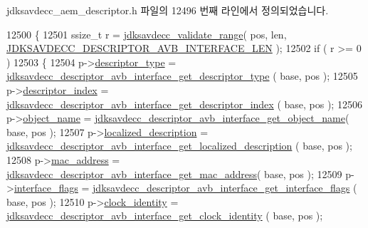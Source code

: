 jdksavdecc\+\_\+aem\+\_\+descriptor.\+h 파일의 12496 번째 라인에서 정의되었습니다.


\begin{DoxyCode}
12500 \{
12501     ssize\_t r = \hyperlink{group__util_ga9c02bdfe76c69163647c3196db7a73a1}{jdksavdecc\_validate\_range}( pos, len, 
      \hyperlink{group__descriptor__avb__interface_gaa0de60188c16df7f04fbc87d490112bc}{JDKSAVDECC\_DESCRIPTOR\_AVB\_INTERFACE\_LEN} );
12502     \textcolor{keywordflow}{if} ( r >= 0 )
12503     \{
12504         p->\hyperlink{structjdksavdecc__descriptor__avb__interface_ab7c32b6c7131c13d4ea3b7ee2f09b78d}{descriptor\_type} = 
      \hyperlink{group__descriptor__avb__interface_ga1c64d652a2c9adfc7d6a1ac0ef7cacf6}{jdksavdecc\_descriptor\_avb\_interface\_get\_descriptor\_type}
      ( base, pos );
12505         p->\hyperlink{structjdksavdecc__descriptor__avb__interface_a042bbc76d835b82d27c1932431ee38d4}{descriptor\_index} = 
      \hyperlink{group__descriptor__avb__interface_ga0473b9e480558f799641f95d41ffb3ed}{jdksavdecc\_descriptor\_avb\_interface\_get\_descriptor\_index}
      ( base, pos );
12506         p->\hyperlink{structjdksavdecc__descriptor__avb__interface_a7d1f5945a13863b1762fc6db74fa8f80}{object\_name} = 
      \hyperlink{group__descriptor__avb__interface_gae840cc23667c9361f7d14a3d9c55c2f6}{jdksavdecc\_descriptor\_avb\_interface\_get\_object\_name}( 
      base, pos );
12507         p->\hyperlink{structjdksavdecc__descriptor__avb__interface_a0926f846ca65a83ad5bb06b4aff8f408}{localized\_description} = 
      \hyperlink{group__descriptor__avb__interface_ga679b329f1e2a503e0118e19743ca2c7b}{jdksavdecc\_descriptor\_avb\_interface\_get\_localized\_description}
      ( base, pos );
12508         p->\hyperlink{structjdksavdecc__descriptor__avb__interface_a335a1976f38f9eb92655c394f62bea82}{mac\_address} = 
      \hyperlink{group__descriptor__avb__interface_gaa297877e1ee6362552129e93a0715ced}{jdksavdecc\_descriptor\_avb\_interface\_get\_mac\_address}( 
      base, pos );
12509         p->\hyperlink{structjdksavdecc__descriptor__avb__interface_adc7cb8c2df340891c22794bfac689e7d}{interface\_flags} = 
      \hyperlink{group__descriptor__avb__interface_ga1f0b55dd5a68d405d1679e8ef5540a14}{jdksavdecc\_descriptor\_avb\_interface\_get\_interface\_flags}
      ( base, pos );
12510         p->\hyperlink{structjdksavdecc__descriptor__avb__interface_a248176d42ca2055074ceb7d8df29700e}{clock\_identity} = 
      \hyperlink{group__descriptor__avb__interface_ga8826498bc53ae6a4dcd6f2e9cdf1c3db}{jdksavdecc\_descriptor\_avb\_interface\_get\_clock\_identity}
      ( base, pos );

\end{DoxyCode}
